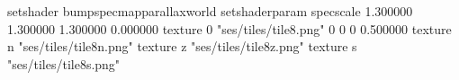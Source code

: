 setshader bumpspecmapparallaxworld
setshaderparam specscale 1.300000 1.300000 1.300000 0.000000
texture 0 "ses/tiles/tile8.png" 0 0 0 0.500000
texture n "ses/tiles/tile8n.png"
texture z "ses/tiles/tile8z.png"
texture s "ses/tiles/tile8s.png"

